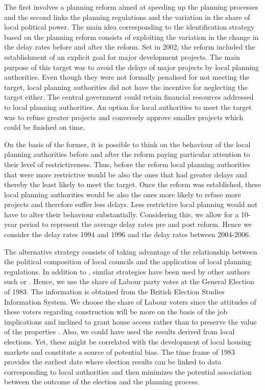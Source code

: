 \documentclass[12pt,letterpaper]{article}
\begin{document}
    The first involves a planning reform aimed at speeding up the planning processes and the
   second links the planning regulations and the variation in the share of local political power. 
The main idea corresponding to the identification strategy based on the planning reform consists
 of exploiting the variation in the change in the delay rates before and after the reform. Set in 2002,
  the reform included the establishment of an explicit goal for major development projects. The main
   purpose of this target was to avoid the delays of major projects by local planning authorities. 
   Even though they were not formally penalised for not meeting the target, local planning authorities did not have
     the incentive for neglecting the target either. The central government could retain financial resources
      addressed to local planning authorities. An option for local authorities to meet the target was to refuse 
      greater projects and conversely approve smaller projects which could be finished on time. 
      
On the basis of the former, it is possible to think on the behaviour of the local planning authorities
 before and after the reform paying particular attention to their level of restrictiveness. Thus, before 
 the reform local planning authorities that were more restrictive would be also the ones that had greater 
 delays and thereby the least likely to meet the target. Once the reform was established, these local 
 planning authorities would be also the ones more likely to refuse more projects and therefore suffer less
  delays. Less restrictive local planning would not have to alter their behaviour substantially.
   Considering this, we allow for a 10-year period to represent the average delay rates pre and post reform.
    Hence we consider the delay rates 1994 and 1996 and the delay rates between 2004-2006.  
    
The alternative strategy consists of taking advantage of the relationship between the political composition of local councils
 and the application of local planning regulations. In addition to 
 \citet{hilber2016supply},
  similar strategies have been used by other authors such \cite{bertrand2002does} or 
  \cite{sadun2015}. 
  Hence, we use the share of Labour party votes at the General Election of 1983.
   The information is obtained from the British Election Studies Information System.  
   We choose the share of Labour voters since the attitudes of these voters 
   regarding construction
   will be more on the basis of the job implications and inclined to grant house access rather than to preserve
    the value of the properties \citep{cheshire2016}.
    Also, we could have used the results derived from local elections. 
    Yet, these might be correlated with the development of local housing markets and constitute a source
     of potential bias. The time frame of 1983 provides the earliest date where election results can be linked
      to data corresponding to local authorities and then minimizes the potential association between the
       outcome of the election and the planning process.
\end{document}
